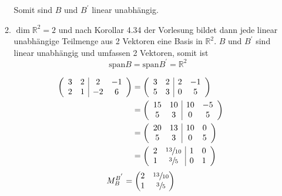 \documentclass{article}
\begin{document}
\begin{enumerate}[(i)]
\begin{enumerate}[label={Zu \arabic*):}]
    Somit sind $B$ und $B^{'}$ linear unabhängig.
  \item
    $\dim \mathbb{R}^2 = 2$ und nach Korollar 4.34 der Vorlesung bildet dann jede linear unabhängige Teilmenge
    aus 2 Vektoren eine Basis in $\mathbb{R}^2$. $B$ und $B^{'}$ sind linear unabhängig und umfassen 2 Vektoren,
    somit ist
    \[
      \text{span} B = \text{span} B^{'} = \mathbb{R}^2
    \]
  \end{enumerate}
  \begin{align*}
    \left(
    \begin{array}{cc|cc}
      3 & 2 & 2  & -1 \\
      2 & 1 & -2 & 6  \\
    \end{array}
    \right)
    &=
    \left(
    \begin{array}{cc|cc}
      3 & 2 & 2 & -1 \\
      5 & 3 & 0 & 5  \\
    \end{array}
    \right) \\
    &=
    \left(
    \begin{array}{cc|cc}
      15 & 10 & 10 & -5 \\
      5  & 3  & 0  & 5  \\
    \end{array}
    \right) \\
    &=
    \left(
    \begin{array}{cc|cc}
      20 & 13 & 10 & 0 \\
      5  & 3  & 0  & 5 \\
    \end{array}
    \right) \\
    &=
    \left(
    \begin{array}{cc|cc}
      2 & \sfrac{13}{10} & 1 & 0 \\
      1 & \sfrac{3}{5}   & 0 & 1 \\
    \end{array}
    \right) \\
  \end{align*}
  \[
    M^{B^{'}}_B = \begin{pmatrix}2&\sfrac{13}{10}\\1&\sfrac{3}{5}\end{pmatrix}
  \]


\end{enumerate}
\end{document}
